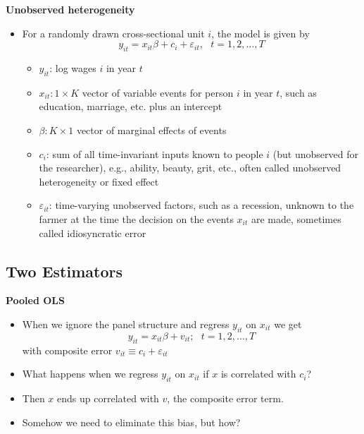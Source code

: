 \documentclass[notes=show]{beamer}
\begin{document}
\begin{frame}[plain]
	\begin{center}
	\textbf{Unobserved heterogeneity}
	\end{center}
	
	\begin{itemize}
	\item For a randomly drawn cross-sectional unit $i$, the model is given by $$y_{it} = x_{it}\beta + c_i + \varepsilon_{it}, \text{   }t=1,2,\dots,T$$
		\begin{itemize}
		\item $y_{it}$: log wages $i$ in year $t$
		\item $x_{it}:1 \times K$ vector of variable events for person $i$ in year $t$, such as education, marriage, etc. plus an intercept
		\item $\beta: K\times 1$ vector of marginal effects of events
		\item $c_i$: sum of all time-invariant inputs known to people $i$ (but unobserved for the researcher), e.g., ability, beauty, grit, etc., often called unobserved heterogeneity or fixed effect
		\item $\varepsilon_{it}$: time-varying unobserved factors, such as a recession, unknown to the farmer at the time the decision on the events $x_{it}$ are made, sometimes called idiosyncratic error
		\end{itemize}
	\end{itemize}
\end{frame}

\subsection{Two Estimators}

\begin{frame}
\begin{center}
\textbf{Pooled OLS}
\end{center}

\begin{itemize}
	\item When we ignore the panel structure and regress $y_{it}$ on $x_{it}$ we get$$ y_{it}=x_{it}\beta + v_{it}; \text{    }t=1,2,\dots,T$$with composite error $v_{it} \equiv c_i + \varepsilon_{it}$
	\item What happens when we regress $y_{it}$ on $x_{it}$ if $x$ is correlated with $c_i$?
	\item Then $x$ ends up correlated with $v$, the composite error term.
	\item Somehow we need to eliminate this bias, but how?
\end{itemize}

\end{frame}
\end{document}
